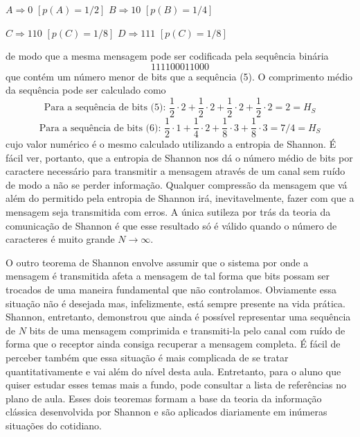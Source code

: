 \documentclass{article}
\begin{document}
\begin{center}
    $A \Longrightarrow 0$ $[p(A) = 1/2]$ \hspace{0.5cm} $B \Longrightarrow 10$ $[p(B) = 1/4]$
\end{center}
\begin{center}
    $C \Longrightarrow 110$ $[p(C) = 1/8]$ \hspace{0.5cm} $D \Longrightarrow 111$ $[p(C) = 1/8]$
\end{center}
de modo que a mesma mensagem pode ser codificada pela sequência binária 
\begin{equation}
    111100011000
\end{equation}
que contém um número menor de bits que a sequência (5). O comprimento médio da sequência pode ser calculado como
\begin{equation}
    \text{Para a sequência de bits (5): } \frac{1}{2}\cdot 2 + \frac{1}{2}\cdot 2 + \frac{1}{2}\cdot 2 + \frac{1}{2}\cdot 2 = 2 = H_S
\end{equation}
\begin{equation}
    \text{Para a sequência de bits (6): } \frac{1}{2}\cdot 1 + \frac{1}{4}\cdot 2 + \frac{1}{8}\cdot 3 + \frac{1}{8}\cdot 3 = 7/4 = H_S
\end{equation}
cujo valor numérico é o mesmo calculado utilizando a entropia de Shannon. É fácil ver, portanto, que a entropia de Shannon nos dá o número médio de bits por caractere necessário para transmitir a mensagem através de um canal sem ruído de modo a não se perder informação. Qualquer compressão da mensagem que vá além do permitido pela entropia de Shannon irá, inevitavelmente, fazer com que a mensagem seja transmitida com erros. A única sutileza por trás da teoria da comunicação de Shannon é que esse resultado só é válido quando o número de caracteres é muito grande $N \rightarrow \infty$.

O outro teorema de Shannon envolve assumir que o sistema por onde a mensagem é transmitida afeta a mensagem de tal forma que bits possam ser trocados de uma maneira fundamental que não controlamos. Obviamente essa situação não é desejada mas, infelizmente, está sempre presente na vida prática. Shannon, entretanto, demonstrou que ainda é possível representar uma sequência de $N$ bits de uma mensagem comprimida e transmiti-la pelo canal com ruído de forma que o receptor ainda consiga recuperar a mensagem completa. É fácil de perceber também que essa situação é mais complicada de se tratar quantitativamente e vai além do nível desta aula. Entretanto, para o aluno que quiser estudar esses temas mais a fundo, pode consultar a lista de referências no plano de aula. Esses dois teoremas formam a base da teoria da informação clássica desenvolvida por Shannon e são aplicados diariamente em inúmeras situações do cotidiano.
\end{document}
